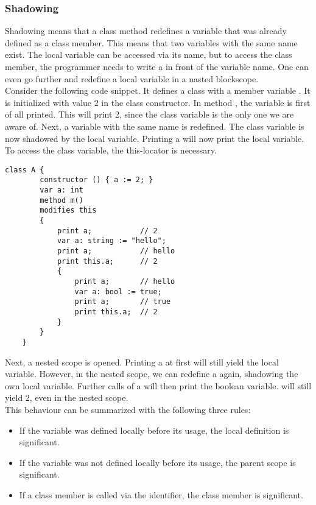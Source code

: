 \subsubsection{Shadowing}

Shadowing means that a class method redefines a variable that was already defined as a class member. This means that two variables with the same name exist. The local variable can be accessed via its name, but to access the class member, the programmer needs to write a  in front of the variable name. One can even go further and redefine a local variable in a nasted blockscope.\\

Consider the following code snippet. It defines a class with a member variable . It is initialized with value 2 in the class constructor. In method , the variable  is first of all printed. This will print 2, since the class variable is the only one we are aware of. Next, a variable with the same name is redefined. The class variable is now shadowed by the local variable. Printing a will now print the local variable. To access the class variable, the this-locator is necessary.

\begin{lstlisting}[caption={Complex Shadowing Example}, captionpos=b, label={lst:shadowing}]
    class A {
        constructor () { a := 2; }
        var a: int
        method m()
        modifies this
        {
            print a;           // 2
            var a: string := "hello";
            print a;           // hello
            print this.a;      // 2
            {
                print a;       // hello
                var a: bool := true;
                print a;       // true
                print this.a;  // 2
            }
        }
    }
\end{lstlisting}

Next, a nested scope is opened. Printing a at first will still yield the local variable. However, in the nested scope, we can redefine a again, shadowing the own local variable. Further calls of a will then print the boolean variable.  will still yield 2, even in the nested scope.\\

This behaviour can be summarized with the following three rules:
\begin{itemize}
    \item If the variable was defined locally before its usage, the local definition is significant.
    \item If the variable was not defined locally before its usage, the parent scope is significant.
    \item If a class member is called via the  identifier, the class member is significant.
\end{itemize}

